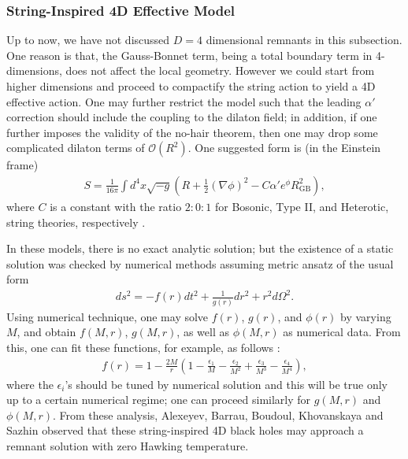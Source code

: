 \documentclass[12pt]{article}
\newcommand{\2}{$^2$}
\newcommand{\3}{$^3$}
\newcommand{\4}{$_4$}
\newcommand{\5}{$_5$}
\begin{document}
\subsubsection{String-Inspired 4D Effective Model}

Up to now, we have not discussed $D=4$ dimensional remnants in this subsection. One reason is that, the Gauss-Bonnet term, being a total boundary term in 4-dimensions, does not affect the local geometry. However we could start from higher dimensions and proceed to compactify the string action to yield a 4D effective action. One may further restrict the model such that the leading $\alpha'$ correction should include the coupling to the dilaton field; in addition, if one further imposes the validity of the no-hair theorem, then one may drop some complicated dilaton terms of $\mathcal{O}(R^{2})$. One suggested form is (in the Einstein frame) \cite{Kanti:1995vq} 
\begin{eqnarray}
S = \frac{1}{16\pi } \int d^{4}x \sqrt{-g} \left( R + \frac{1}{2}\left(\nabla \phi\right)^{2} - C \alpha' e^{\phi} R_{\mathrm{GB}}^{2} \right),
\end{eqnarray}
where $C$ is a constant with the ratio $2:0:1$ for Bosonic, Type II, and Heterotic, string theories, respectively \cite{Ratioc}. 

In these models, there is no exact analytic solution; but the existence of a static solution was checked by numerical methods \cite{Kanti:1995vq} assuming metric ansatz of the usual form
\begin{eqnarray}
ds^{2} = - f(r) dt^{2} + \frac{1}{g(r)} dr^{2} + r^{2} d\Omega^{2}.
\end{eqnarray}
Using numerical technique, one may solve $f(r)$, $g(r)$, and $\phi(r)$ by varying $M$, and obtain $f(M,r)$, $g(M,r)$, as well as $\phi(M, r)$ as numerical data. From this, one can fit these functions, for example, as follows \cite{Alexeyev:2002tg}:
\begin{eqnarray}
f(r) = 1 - \frac{2M}{r} \left( 1 - \frac{\epsilon_{1}}{M} - \frac{\epsilon_{2}}{M^{2}} + \frac{\epsilon_{3}}{M^{3}}- \frac{\epsilon_{4}}{M^{4}} \right),
\end{eqnarray}
where the $\epsilon_{i}$'s should be tuned by numerical solution and this will be true only up to a certain numerical regime; one can proceed similarly for $g(M,r)$ and $\phi(M, r)$. From these analysis, Alexeyev, Barrau, Boudoul, Khovanskaya and Sazhin \cite{Alexeyev:2002tg} observed that these string-inspired 4D black holes may approach a remnant solution with zero Hawking temperature.
\end{document}
